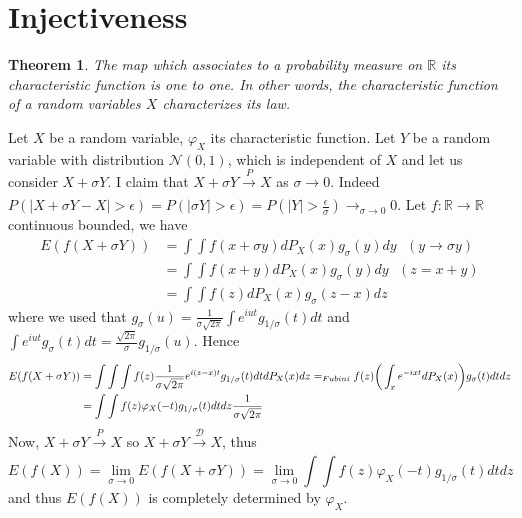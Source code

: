 \documentclass[10pt,a4paper]{book}
\newcommand{\R}{\mathbb{R}}
\newtheorem{theorem}{Theorem}[section]
\theoremstyle{definition}
\begin{document}
\section{Injectiveness}
\begin{theorem}
The map which associates to a probability measure on $\R$ its characteristic function is one to one. In other words, the characteristic function of a random variables $X$ characterizes its law.
\end{theorem}
\proof Let $X$ be a random variable, $\varphi_X$ its characteristic function. Let $Y$ be a random variable with distribution $\mathcal{N}(0,1)$, which is independent of $X$ and let us consider $X+\sigma Y$. I claim that $X+\sigma Y\xrightarrow[]{P} X$ as $\sigma \to 0$. Indeed $P(|X+\sigma Y-X|>\epsilon)=P(|\sigma Y|>\epsilon)=P(|Y|>\frac{\epsilon}{\sigma})\to_{\sigma\to 0} 0$. Let $f:\R\to\R$ continuous bounded, we have 
\begin{align*}
E(f(X+\sigma Y))&=\int\int f(x+\sigma y)dP_X(x)g_{\sigma}(y)dy\,\,\,\,(y\to \sigma y)\\
&=\int\int f(x+y)dP_X(x)g_{\sigma}(y)dy\,\,\,\,(z=x+y)\\
&=\int\int f(z)dP_X(x)g_{\sigma}(z-x)dz
\end{align*}
where we used that $g_{\sigma}(u)=\frac{1}{\sigma\sqrt{2\pi}}\int e^{iut}g_{1/\sigma}(t)dt$ and $\int e^{iut}g_{\sigma}(t)dt=\frac{\sqrt{2\pi}}{\sigma}g_{1/\sigma}(u)$. Hence 
\begin{align*}
E(f(X+\sigma Y))&=\int\int\int f(z)\frac{1}{\sigma\sqrt{2\pi}}e^{i(z-x)t}g_{1/\sigma}(t)dtdP_X(x)dz=_{Fubini}f(z)\bigg(\int_{x}e^{-ixt}dP_X(x)\bigg)g_{\/\sigma}(t)dtdz\\
&=\int\int f(z)\varphi_X(-t)g_{1/\sigma}(t)dtdz\frac{1}{\sigma\sqrt{2\pi}}
\end{align*}
Now, $X+\sigma Y\xrightarrow[]{P} X$ so $X+\sigma Y\xrightarrow[]{\mathcal{D}} X$, thus 
$$E(f(X))=\lim_{\sigma\to 0}E(f(X+\sigma Y))=\lim_{\sigma\to 0}\int\int f(z)\varphi_X(-t)g_{1/\sigma}(t)dtdz$$
and thus $E(f(X))$ is completely determined by $\varphi_X$.
\end{document}
